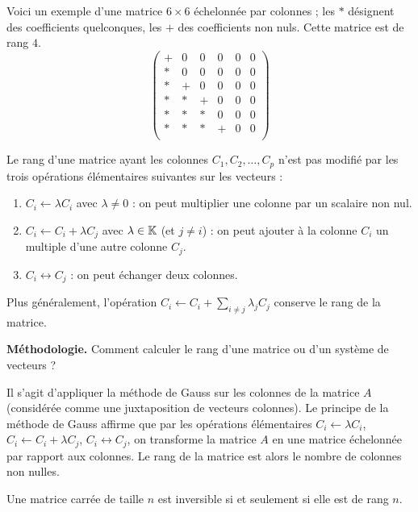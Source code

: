 \documentclass[10pt,class=article,crop=false]{standalone}
\begin{document}
\begin{multicols}{2}
Voici un exemple d'une matrice $6\times6$ échelonnée par colonnes ;
les $*$ désignent des coefficients quelconques, les $+$ des coefficients non nuls.
Cette matrice est de rang $4$.
{\small
$$
\begin{pmatrix}
	+ & 0 & 0 & 0 & 0 & 0 \\
	* & 0 & 0 & 0 & 0 & 0 \\
	* & + & 0 & 0 & 0 & 0 \\
	* & * & + & 0 & 0 & 0 \\
	* & * & * & 0 & 0 & 0 \\
	* & * & * & + & 0 & 0 \\
\end{pmatrix}
$$
}


\begin{proposition}
	\label{prop:opcolonnes}
	Le rang d'une matrice ayant les colonnes $C_1, C_2, \ldots, C_p$
	n'est pas modifié par les trois opérations élémentaires suivantes sur les
	vecteurs :
	\begin{enumerate}
		\item $C_i \leftarrow \lambda C_i$ avec $\lambda \neq 0$ :
		on peut multiplier une colonne par un scalaire non nul.
		
		\item $C_i \leftarrow C_i+\lambda C_j$ avec $\lambda \in \mathbb{K}$ (et $j\neq i$) :
		on peut ajouter à la colonne $C_i$ un multiple d'une autre colonne $C_j$.
		
		\item $C_i \leftrightarrow C_j$ : on peut échanger deux colonnes.
	\end{enumerate}
\end{proposition}

Plus généralement, l'opération
$C_i \leftarrow C_i + \sum_{i\neq j} \lambda_j C_j$
conserve le rang de la matrice.

\textbf{Méthodologie.} Comment calculer le rang d'une matrice ou d'un système de vecteurs ?

Il s'agit d'appliquer la méthode de Gauss sur les colonnes de la matrice $A$
(considérée comme une juxtaposition de vecteurs colonnes).
Le principe de la méthode de Gauss affirme que par les opérations élémentaires
$C_i \leftarrow \lambda C_i$,
$C_i \leftarrow C_i+\lambda C_j$,
$C_i \leftrightarrow C_j$, on transforme la matrice $A$ en une matrice échelonnée
par rapport aux colonnes.
Le rang de la matrice est alors le nombre de colonnes non nulles.

\begin{theoreme}
	Une matrice carrée de taille $n$ est inversible si et seulement si elle
	est de rang $n$.
\end{theoreme}



\end{multicols}
\end{document}
